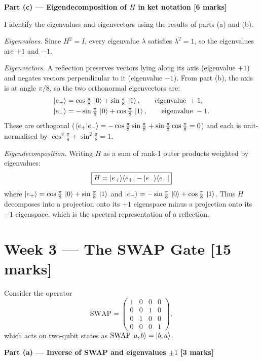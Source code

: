 \documentclass[12pt,a4paper]{article}
\begin{document}
\medskip
\textbf{Part (c) --- Eigendecomposition of $H$ in ket notation [6 marks]}

\medskip
I identify the eigenvalues and eigenvectors using the results of parts (a) and (b).

\textit{Eigenvalues.} Since $H^2 = I$, every eigenvalue $\lambda$ satisfies $\lambda^2 = 1$, so the eigenvalues are $+1$ and $-1$.

\textit{Eigenvectors.} A reflection preserves vectors lying along its axis (eigenvalue $+1$) and negates vectors perpendicular to it (eigenvalue $-1$). From part (b), the axis is at angle $\pi/8$, so the two orthonormal eigenvectors are:
\begin{align*}
\ket{e_+} &= \cos\tfrac{\pi}{8}\,\ket{0} + \sin\tfrac{\pi}{8}\,\ket{1},
  \qquad \text{eigenvalue }+1, \\
\ket{e_-} &= {-}\sin\tfrac{\pi}{8}\,\ket{0} + \cos\tfrac{\pi}{8}\,\ket{1},
  \qquad \text{eigenvalue }-1.
\end{align*}
These are orthogonal ($\braket{e_+|e_-} = -\cos\tfrac{\pi}{8}\sin\tfrac{\pi}{8}+\sin\tfrac{\pi}{8}\cos\tfrac{\pi}{8} = 0$) and each is unit-normalised by $\cos^2\!\tfrac{\pi}{8}+\sin^2\!\tfrac{\pi}{8}=1$.

\textit{Eigendecomposition.} Writing $H$ as a sum of rank-1 outer products weighted by eigenvalues:
\[
  \boxed{H = \ket{e_+}\!\bra{e_+} - \ket{e_-}\!\bra{e_-}}
\]
where
$\ket{e_+} = \cos\tfrac{\pi}{8}\,\ket{0}+\sin\tfrac{\pi}{8}\,\ket{1}$
and
$\ket{e_-} = -\sin\tfrac{\pi}{8}\,\ket{0}+\cos\tfrac{\pi}{8}\,\ket{1}$.
Thus $H$ decomposes into a projection onto its $+1$ eigenspace minus a projection onto its $-1$ eigenspace, which is the spectral representation of a reflection.

\section*{Week 3 --- The SWAP Gate [15 marks]}

Consider the operator
\[
  \mathrm{SWAP} =
  \begin{pmatrix}1&0&0&0\\0&0&1&0\\0&1&0&0\\0&0&0&1\end{pmatrix},
\]
which acts on two-qubit states as $\mathrm{SWAP}\ket{a,b}=\ket{b,a}$.

\medskip
\textbf{Part (a) --- Inverse of SWAP and eigenvalues $\pm1$ [3 marks]}
\end{document}
